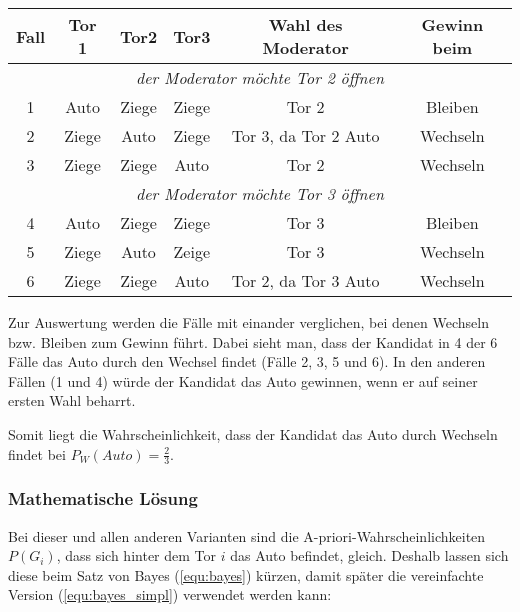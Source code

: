 \begin{tabular}[h]{|c|c|c|c|c|c|}
    \hline
    \textbf{Fall} & \textbf{Tor 1} & \textbf{Tor2} & \textbf{Tor3} & \textbf{Wahl des Moderator} & \textbf{Gewinn beim} \\
    \hline
    \multicolumn{6}{|c|}{\textit{der Moderator möchte Tor 2 öffnen} }                                                   \\
    \hline
    1             & Auto           & Ziege         & Ziege         & Tor 2                       & Bleiben              \\
    2             & Ziege          & Auto          & Ziege         & Tor 3, da Tor 2 Auto        & Wechseln             \\
    3             & Ziege          & Ziege         & Auto          & Tor 2                       & Wechseln             \\
    \hline
    \multicolumn{6}{|c|}{\textit{der Moderator möchte Tor 3 öffnen}
    }                                                                                                                   \\
    \hline
    4             & Auto           & Ziege         & Ziege         & Tor 3                       & Bleiben              \\
    5             & Ziege          & Auto          & Zeige         & Tor 3                       & Wechseln             \\
    6             & Ziege          & Ziege         & Auto          & Tor 2, da Tor 3 Auto        & Wechseln             \\
    \hline
\end{tabular}

Zur Auswertung werden die Fälle mit einander verglichen, bei denen Wechseln bzw. Bleiben zum Gewinn führt.
Dabei sieht man, dass der Kandidat in 4 der 6 Fälle das Auto durch den Wechsel findet (Fälle 2, 3, 5 und 6). In den anderen Fällen (1 und 4) würde der Kandidat das Auto gewinnen, wenn er auf seiner ersten Wahl beharrt.

Somit liegt die Wahrscheinlichkeit, dass der Kandidat das Auto durch Wechseln findet bei $P_W(Auto) = \frac{2}{3}$.

\subsubsection{Mathematische Lösung}

Bei dieser und allen anderen Varianten sind die A-priori-Wahrscheinlichkeiten $P(G_i)$, dass sich hinter dem Tor $i$ das Auto befindet, gleich. Deshalb lassen sich diese beim Satz von Bayes (\autoref{equ:bayes}) kürzen, damit später die vereinfachte Version (\autoref{equ:bayes_simpl}) verwendet werden kann:

